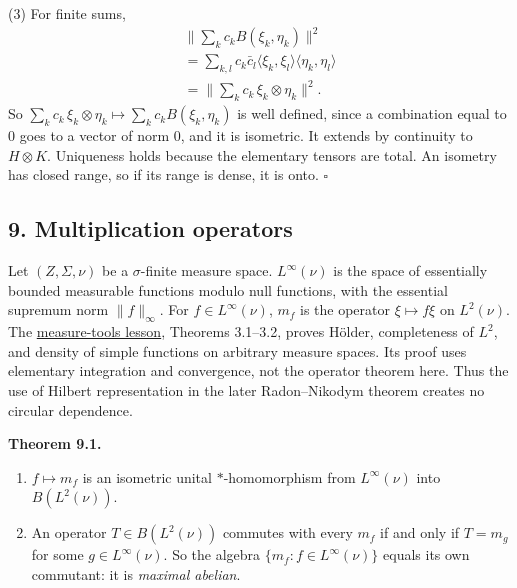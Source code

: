 \documentclass[
  english,
  11pt,
  a4paper,
]{article}
\providecommand{\tightlist}{%
  \setlength{\itemsep}{0pt}\setlength{\parskip}{0pt}}
\begin{document}
(3) For finite sums, \[\begin{gathered}
\Big\|\sum_kc_kB(\xi_k,\eta_k)\Big\|^2\\
=\sum_{k,l}c_k\bar c_l\langle\xi_k,\xi_l\rangle\langle\eta_k,\eta_l\rangle\\
=\Big\|\sum_kc_k\,\xi_k\otimes\eta_k\Big\|^2 .
\end{gathered}\] So
\(\sum_kc_k\,\xi_k\otimes\eta_k\mapsto\sum_kc_kB(\xi_k,\eta_k)\) is well
defined, since a combination equal to \(0\) goes to a vector of norm
\(0\), and it is isometric. It extends by continuity to \(H\otimes K\).
Uniqueness holds because the elementary tensors are total. An isometry
has closed range, so if its range is dense, it is onto. \(\square\)

\subsection[9. Multiplication
operators]{\texorpdfstring{\protect\hypertarget{hilbert-spaces-and-compact-operators--oa-fnd-hs-09}{}{}9.
Multiplication
operators}{9. Multiplication operators}}\label{hilbert-spaces-and-compact-operators--OA-FND-HS-09}

Let \((Z,\Sigma,\nu)\) be a \(\sigma\)-finite measure space.
\(L^\infty(\nu)\) is the space of essentially bounded measurable
functions modulo null functions, with the essential supremum norm
\(\|f\|_\infty\). For \(f\in L^\infty(\nu)\), \(m_f\) is the operator
\(\xi\mapsto f\xi\) on \(L^2(\nu)\). The
\hyperref[measure-and-hilbert-space-tools--3-the-complete-spaces-of-integrable-functions]{measure-tools
lesson}, Theorems 3.1--3.2, proves Hölder, completeness of \(L^2\), and
density of simple functions on arbitrary measure spaces. Its proof uses
elementary integration and convergence, not the operator theorem here.
Thus the use of Hilbert representation in the later Radon--Nikodym
theorem creates no circular dependence.

\textbf{Theorem 9.1.}

\begin{enumerate}
\tightlist
\item
  \(f\mapsto m_f\) is an isometric unital \(*\)-homomorphism from
  \(L^\infty(\nu)\) into \(B(L^2(\nu))\).
\item
  An operator \(T\in B(L^2(\nu))\) commutes with every \(m_f\) if and
  only if \(T=m_g\) for some \(g\in L^\infty(\nu)\). So the algebra
  \(\{m_f:f\in L^\infty(\nu)\}\) equals its own commutant: it is
  \emph{maximal abelian}.
\end{enumerate}
\end{document}
